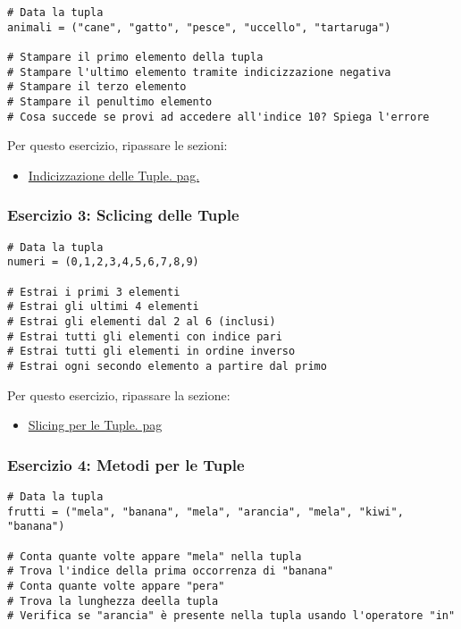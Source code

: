 \begin{lstlisting}
# Data la tupla
animali = ("cane", "gatto", "pesce", "uccello", "tartaruga")

# Stampare il primo elemento della tupla
# Stampare l'ultimo elemento tramite indicizzazione negativa
# Stampare il terzo elemento
# Stampare il penultimo elemento
# Cosa succede se provi ad accedere all'indice 10? Spiega l'errore
\end{lstlisting}

Per questo esercizio, ripassare le sezioni:
 \begin{itemize}
     \item \hyperref[TupleIndicizzazione]{Indicizzazione delle Tuple. pag.\pageref{TupleIndicizzazione}}
 \end{itemize}


 \subsubsection{Esercizio 3: Sclicing delle Tuple}\label{Esercizio3Tuple}
 \begin{lstlisting}
# Data la tupla
numeri = (0,1,2,3,4,5,6,7,8,9)

# Estrai i primi 3 elementi
# Estrai gli ultimi 4 elementi
# Estrai gli elementi dal 2 al 6 (inclusi)
# Estrai tutti gli elementi con indice pari
# Estrai tutti gli elementi in ordine inverso
# Estrai ogni secondo elemento a partire dal primo
 \end{lstlisting}

 Per questo esercizio, ripassare la sezione:
 \begin{itemize}
     \item \hyperref[SlicingTuple]{Slicing per le Tuple. pag\pageref{SlicingTuple}}
 \end{itemize}
 

 \subsubsection{Esercizio 4: Metodi per le Tuple}\label{Eserciozio4Tuple}
 \begin{lstlisting}
# Data la tupla 
frutti = ("mela", "banana", "mela", "arancia", "mela", "kiwi", "banana")

# Conta quante volte appare "mela" nella tupla
# Trova l'indice della prima occorrenza di "banana"
# Conta quante volte appare "pera"
# Trova la lunghezza deella tupla
# Verifica se "arancia" è presente nella tupla usando l'operatore "in" 
 \end{lstlisting}

